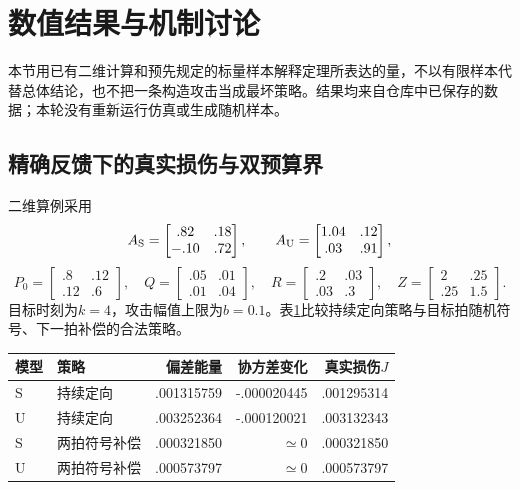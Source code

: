 \section{数值结果与机制讨论}
本节用已有二维计算和预先规定的标量样本解释定理所表达的量，不以有限样本代替总体结论，也不把一条构造攻击当成最坏策略。结果均来自仓库中已保存的数据；本轮没有重新运行仿真或生成随机样本。

\subsection{精确反馈下的真实损伤与双预算界}
二维算例采用
\[
A_{\rm S}=\begin{bmatrix}.82&.18\\-.10&.72\end{bmatrix},\qquad
A_{\rm U}=\begin{bmatrix}1.04&.12\\.03&.91\end{bmatrix},
\]
\[
P_0=\begin{bmatrix}.8&.12\\.12&.6\end{bmatrix},\quad
Q=\begin{bmatrix}.05&.01\\.01&.04\end{bmatrix},\quad
R=\begin{bmatrix}.2&.03\\.03&.3\end{bmatrix},\quad
Z=\begin{bmatrix}2&.25\\.25&1.5\end{bmatrix}.
\]
目标时刻为$k=4$，攻击幅值上限为$b=0.1$。表\ref{tab:damage-decomp}比较持续定向策略与目标拍随机符号、下一拍补偿的合法策略。

\begin{table}[ht]
\centering\footnotesize
{}
\label{tab:damage-decomp}
\begin{tabular}{llrrr}
\toprule
模型 & 策略 & 偏差能量 & 协方差变化 & 真实损伤$J$\\
\midrule
S & 持续定向 & .001315759 & -.000020445 & .001295314\\
U & 持续定向 & .003252364 & -.000120021 & .003132343\\
S & 两拍符号补偿 & .000321850 & $\simeq0$ & .000321850\\
U & 两拍符号补偿 & .000573797 & $\simeq0$ & .000573797\\
\bottomrule
\end{tabular}
\end{table}

